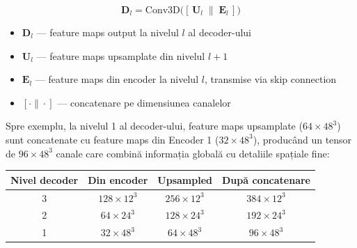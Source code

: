 \documentclass[12pt, a4paper]{report}
\begin{document}
\begin{equation}
    \mathbf{D}_l
    = \text{Conv3D}\!\bigl([\,\mathbf{U}_l \;\|\; \mathbf{E}_l\,]\bigr)
\end{equation}

\begin{itemize}
    \item $\mathbf{D}_l$ — feature maps output la nivelul $l$ al decoder-ului
    \item $\mathbf{U}_l$ — feature maps upsamplate din nivelul $l+1$
    \item $\mathbf{E}_l$ — feature maps din encoder la nivelul $l$, transmise via skip connection
    \item $[\cdot\|\cdot]$ — concatenare pe dimensiunea canalelor
\end{itemize}




Spre exemplu, la nivelul 1 al decoder-ului, feature maps
upsamplate ($64 \times 48^3$) sunt concatenate cu feature maps
din Encoder 1 ($32 \times 48^3$), producând un tensor de
$96 \times 48^3$ canale care combină informația globală
cu detaliile spațiale fine:

\begin{center}
\begin{tabular}{cccc}
    \toprule
    \textbf{Nivel decoder} & \textbf{Din encoder} &
    \textbf{Upsampled} & \textbf{După concatenare} \\
    \midrule
    3 & $128 \times 12^3$ & $256 \times 12^3$ & $384 \times 12^3$ \\
    2 & $64  \times 24^3$ & $128 \times 24^3$ & $192 \times 24^3$ \\
    1 & $32  \times 48^3$ & $64  \times 48^3$ & $96  \times 48^3$ \\
    \bottomrule
\end{tabular}
\end{center}
\end{document}
